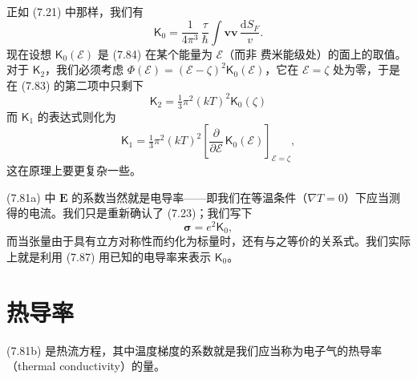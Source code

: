 正如 (7.21) 中那样，我们有
\begin{equation*}
\mathsf{K}_{0}=\frac{1}{4\pi^{3}}\,\frac{\tau}{\hbar}\int\mathbf{v}\mathbf{v}\,\frac{\mathrm{d}S_{F}}{v}.\tag{7.84}
\end{equation*}
现在设想 $\mathsf{K}_{0}(\mathcal{E})$ 是 (7.84) 在某个能量为 $\mathcal{E}$（而非 费米能级处）的面上的取值。对于 $\mathsf{K}_{2}$，我们必须考虑 $\Phi(\mathcal{E})=(\mathcal{E}-\zeta)^{2}\mathsf{K}_{0}(\mathcal{E})$，它在 $\mathcal{E}=\zeta$ 处为零，于是在 (7.83) 的第二项中只剩下
\begin{equation*}
\mathsf{K}_{2}=\tfrac{1}{3}\pi^{2}(kT)^{2}\mathsf{K}_{0}(\zeta)\tag{7.85}
\end{equation*}
而 $\mathsf{K}_{1}$ 的表达式则化为
\begin{equation*}
\mathsf{K}_{1}=\tfrac{1}{3}\pi^{2}(kT)^{2}\left[\frac{\partial}{\partial\mathcal{E}}\,\mathsf{K}_{0}(\mathcal{E})\right]_{\mathcal{E}=\zeta},\tag{7.86}
\end{equation*}
这在原理上要更复杂一些。

(7.81a) 中 $\mathbf{E}$ 的系数当然就是电导率——即我们在等温条件（$\nabla T=0$）下应当测得的电流。我们只是重新确认了 (7.23)；我们写下
\begin{equation*}
\boldsymbol{\sigma}=e^{2}\mathsf{K}_{0},\tag{7.87}
\end{equation*}
而当张量由于具有立方对称性而约化为标量时，还有与之等价的关系式。我们实际上就是利用 (7.87) 用已知的电导率来表示 $\mathsf{K}_{0}$。

\section{热导率}

(7.81b) 是热流方程，其中温度梯度的系数就是我们应当称为电子气的热导率（thermal conductivity）的量。

